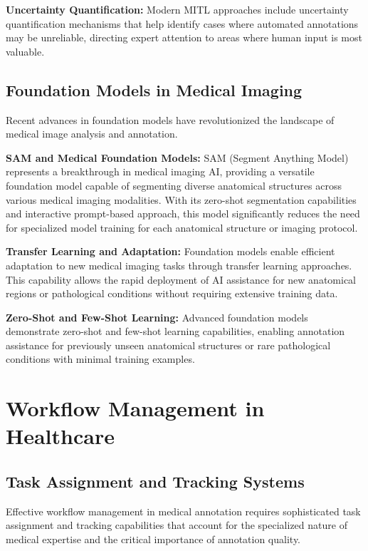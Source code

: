 \textbf{Uncertainty Quantification:} Modern MITL approaches include uncertainty quantification mechanisms that help identify cases where automated annotations may be unreliable, directing expert attention to areas where human input is most valuable.

\subsection{Foundation Models in Medical Imaging}

Recent advances in foundation models have revolutionized the landscape of medical image analysis and annotation.

\textbf{SAM and Medical Foundation Models:} SAM (Segment Anything Model) represents a breakthrough in medical imaging AI, providing a versatile foundation model capable of segmenting diverse anatomical structures across various medical imaging modalities. With its zero-shot segmentation capabilities and interactive prompt-based approach, this model significantly reduces the need for specialized model training for each anatomical structure or imaging protocol.

\textbf{Transfer Learning and Adaptation:} Foundation models enable efficient adaptation to new medical imaging tasks through transfer learning approaches. This capability allows the rapid deployment of AI assistance for new anatomical regions or pathological conditions without requiring extensive training data.

\textbf{Zero-Shot and Few-Shot Learning:} Advanced foundation models demonstrate zero-shot and few-shot learning capabilities, enabling annotation assistance for previously unseen anatomical structures or rare pathological conditions with minimal training examples.

\section{Workflow Management in Healthcare}

\subsection{Task Assignment and Tracking Systems}

Effective workflow management in medical annotation requires sophisticated task assignment and tracking capabilities that account for the specialized nature of medical expertise and the critical importance of annotation quality.

